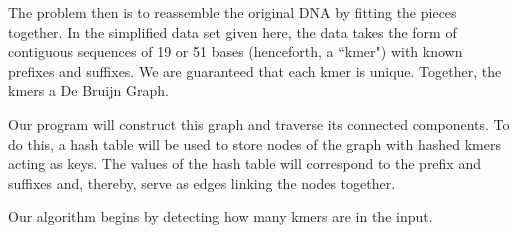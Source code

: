 \documentclass{article}
\begin{document}
\begin{enumerate}
The problem then is to reassemble the original DNA by fitting the pieces together. In the simplified data set given here, the data takes the form of contiguous sequences of 19 or 51 bases (henceforth, a ``kmer") with known prefixes and suffixes. We are guaranteed that each kmer is unique. Together, the kmers a De Bruijn Graph.

Our program will construct this graph and traverse its connected components. To do this, a hash table will be used to store nodes of the graph with hashed kmers acting as keys. The values of the hash table will correspond to the prefix and suffixes and, thereby, serve as edges linking the nodes together.

Our algorithm begins by detecting how many kmers are in the input.


\begin{comment}
Before coding up the genome assembly in parallel, we will first describe the approach for shotgun de novo genome assembly with a serial algorithm for comparison with setting up a UPC algorithm. Algorithm~\ref{serial} shows a cleaned up version of the main bulk of the code while Algorithms~\ref{packingDNAseq}--~\ref{contig_generation} show the code used to define packing routines and structures for the kmers. Overall one can see that there are three parts to the code: (1) Initialization of kmer values and hash table memory, (2) De Bruijn Graph Construction, (3) De Bruijn Graph Traversal. 

The code takes the input to be a set of unique k-mers along with their corresponding forward and backward extensions. To denote start/terminating kmer for a contig, there is a possibility of an extension being a ``guard" extension F which is incorporated into the hash table. We assume that the unique kmers have already been screened for errors so that the first step of the algorithm is to read in the unique values and construct a hash table with keys equal to the kmer and values equal to the forward and backward extensions. As shown in Algorithm~\ref{serial} the hash table is initialized with pre-allocated memory.  Within the graph construction step, the hash table is populated and a Start list is created to denote which Kmers will begin a contig. 

After the hash table has been populated, the Graph Traversal step begins by looping through the kmer Start list, which provides a ``seed" for the contigs that are created. Each traversal seed is added onto by appending the  the forward extension to the last n-1 k-mer values (where n is the kmer length defined in ~\ref{contig_generation}) and referring to the hash table for the next forward extension. This process is continued until a ``guard" extension is reached, at which point the contig is finished and printed to an external file. 


\end{comment}
\end{enumerate}
\end{document}
